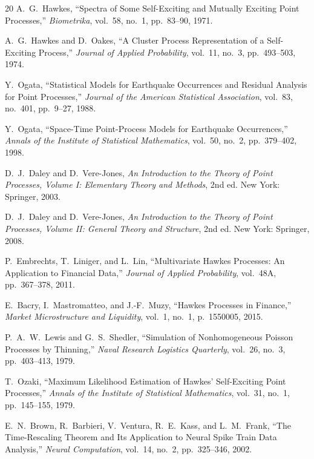\documentclass[a4paper, 11pt]{article}
\begin{document}
\begin{thebibliography}{20}
 A.~G.~Hawkes, ``Spectra of Some Self-Exciting and Mutually Exciting Point Processes,'' \textit{Biometrika}, vol.~58, no.~1, pp.~83--90, 1971.

 A.~G.~Hawkes and D.~Oakes, ``A Cluster Process Representation of a Self-Exciting Process,'' \textit{Journal of Applied Probability}, vol.~11, no.~3, pp.~493--503, 1974.

 Y.~Ogata, ``Statistical Models for Earthquake Occurrences and Residual Analysis for Point Processes,'' \textit{Journal of the American Statistical Association}, vol.~83, no.~401, pp.~9--27, 1988.

 Y.~Ogata, ``Space-Time Point-Process Models for Earthquake Occurrences,'' \textit{Annals of the Institute of Statistical Mathematics}, vol.~50, no.~2, pp.~379--402, 1998.

 D.~J.~Daley and D.~Vere-Jones, \textit{An Introduction to the Theory of Point Processes, Volume I: Elementary Theory and Methods}, 2nd ed. New York: Springer, 2003.

 D.~J.~Daley and D.~Vere-Jones, \textit{An Introduction to the Theory of Point Processes, Volume II: General Theory and Structure}, 2nd ed. New York: Springer, 2008.

 P.~Embrechts, T.~Liniger, and L.~Lin, ``Multivariate Hawkes Processes: An Application to Financial Data,'' \textit{Journal of Applied Probability}, vol.~48A, pp.~367--378, 2011.

 E.~Bacry, I.~Mastromatteo, and J.-F.~Muzy, ``Hawkes Processes in Finance,'' \textit{Market Microstructure and Liquidity}, vol.~1, no.~1, p.~1550005, 2015.

 P.~A.~W.~Lewis and G.~S.~Shedler, ``Simulation of Nonhomogeneous Poisson Processes by Thinning,'' \textit{Naval Research Logistics Quarterly}, vol.~26, no.~3, pp.~403--413, 1979.

 T.~Ozaki, ``Maximum Likelihood Estimation of Hawkes' Self-Exciting Point Processes,'' \textit{Annals of the Institute of Statistical Mathematics}, vol.~31, no.~1, pp.~145--155, 1979.

 E.~N.~Brown, R.~Barbieri, V.~Ventura, R.~E.~Kass, and L.~M.~Frank, ``The Time-Rescaling Theorem and Its Application to Neural Spike Train Data Analysis,'' \textit{Neural Computation}, vol.~14, no.~2, pp.~325--346, 2002.


\end{thebibliography}
\end{document}
